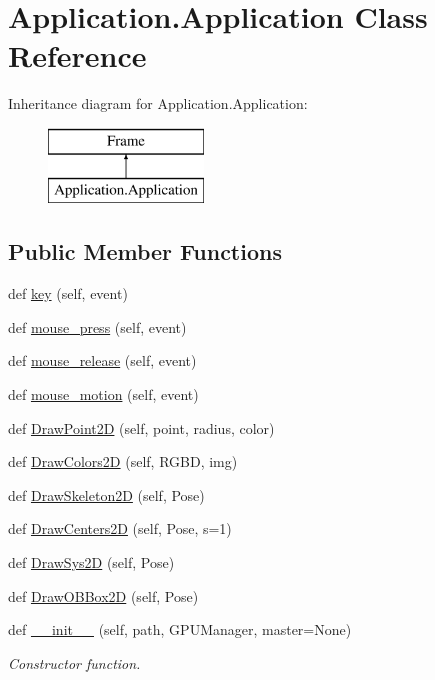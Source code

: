 \hypertarget{class_application_1_1_application}{}\section{Application.\+Application Class Reference}
\label{class_application_1_1_application}
Inheritance diagram for Application.\+Application\+:\begin{figure}[H]
\begin{center}
\leavevmode
\includegraphics[height=2.000000cm]{class_application_1_1_application}
\end{center}
\end{figure}
\subsection*{Public Member Functions}
\begin{DoxyCompactItemize}
\item 
def \hyperlink{class_application_1_1_application_a7f10b75f569cab5769291c54ca1d3762}{key} (self, event)
\item 
def \hyperlink{class_application_1_1_application_ab71deae47ac8b52b81ca833c5fdd3da0}{mouse\+\_\+press} (self, event)
\item 
def \hyperlink{class_application_1_1_application_a239b47672cfb2b3e71302d0536a54e82}{mouse\+\_\+release} (self, event)
\item 
def \hyperlink{class_application_1_1_application_a1a6c84b431acbb546e466eaab2141e51}{mouse\+\_\+motion} (self, event)
\item 
def \hyperlink{class_application_1_1_application_a6564aeb78321ccf643be0b90fe2b388e}{Draw\+Point2D} (self, point, radius, color)
\item 
def \hyperlink{class_application_1_1_application_a935ca95709286fee970c85727bf5bab4}{Draw\+Colors2D} (self, R\+G\+BD, img)
\item 
def \hyperlink{class_application_1_1_application_af36ed2ae19b0450de779306b410dee6f}{Draw\+Skeleton2D} (self, Pose)
\item 
def \hyperlink{class_application_1_1_application_a3280e6b8e4616a56567d0daf7f60ff23}{Draw\+Centers2D} (self, Pose, s=1)
\item 
def \hyperlink{class_application_1_1_application_a24fadbdd7cf0f4318724996b626e8c66}{Draw\+Sys2D} (self, Pose)
\item 
def \hyperlink{class_application_1_1_application_a766ac4121a3cd61ad34b957bced90427}{Draw\+O\+B\+Box2D} (self, Pose)
\item 
def \hyperlink{class_application_1_1_application_a0a1efa05f27e797bfc72d43dd12df6b5}{\+\_\+\+\_\+init\+\_\+\+\_\+} (self, path, G\+P\+U\+Manager, master=None)
\begin{DoxyCompactList}\small\item\em Constructor function. \end{DoxyCompactList}\end{DoxyCompactItemize}
